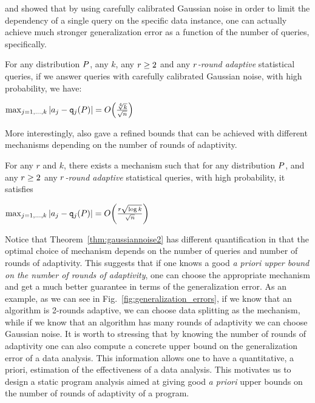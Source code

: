 \citet{DworkFHPRR15} and \citet{BassilyNSSSU16} showed that by using carefully calibrated Gaussian noise in order to limit the dependency of a single query on the specific data instance, one 
can actually achieve much stronger generalization error as a function of the number of queries, specifically.
\begin{thm} \label{thm:gaussiannoise} For any distribution $P$, any $k$, any $r \geq 2$ and any \emph{$r$-round adaptive} statistical queries, if we answer queries with carefully calibrated Gaussian noise, with high probability,  we have:
\begin{center}
  $
\max_{j=1,\dots,k} | \answer_j - \qquery_j(\dist) | = O\left( \frac{\sqrt[4]{k}}{\sqrt{n}}  \right)
$  
\end{center}
\end{thm}
More interestingly, \citet{DworkFHPRR15}
also gave a refined bounds that can be achieved with different mechanisms depending on the number of rounds of adaptivity.   \begin{thm} \label{thm:gaussiannoise2} For any $r$ and $k$, there exists a mechanism such that for any distribution $P$, and any $r \geq 2$ any \emph{$r$-round adaptive} statistical queries, with high probability, it satisfies
\begin{center}
  $
\max_{j=1,\dots,k} | \answer_j - \qquery_j(\dist) | = O\left( \frac{r \sqrt{\log k}}{\sqrt{n}}  \right)
$  
\end{center}
\end{thm}
Notice that Theorem~\ref{thm:gaussiannoise2} has different quantification in that the optimal choice of mechanism depends on the number of queries {and number of rounds of adaptivity}.  This suggests that if one knows a good \emph{a priori upper bound on the number of rounds of adaptivity}, one can choose the appropriate mechanism and get a much better guarantee in terms of the generalization error.
As an example, as we can see in Fig.~\ref{fig:generalization_errors}, if we know that an algorithm is 2-rounds adaptive, we can choose data splitting as {the} mechanism, while if we know that an algorithm has many rounds of adaptivity we can choose Gaussian noise. It is worth to stressing that by knowing the number of rounds of adaptivity one can also compute a concrete upper bound on the generalization error of a data analysis. This information allows one to have a quantitative, a priori, estimation of the effectiveness of a data analysis. 
This motivates us to design a static program analysis aimed at giving good \emph{a priori} upper bounds on the number of rounds of adaptivity of a program. 

